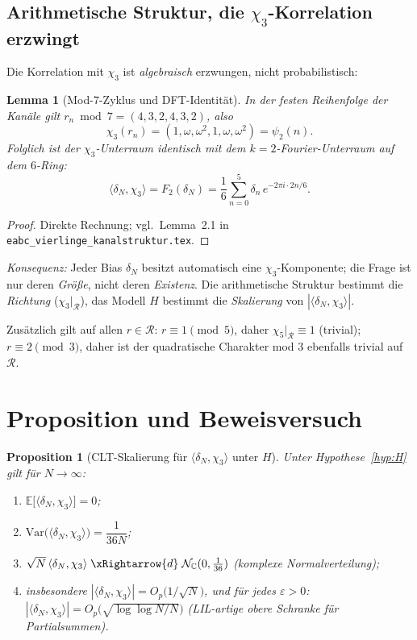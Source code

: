 \documentclass[11pt,a4paper]{article}
\newtheorem{proposition}[theorem]{Proposition}
\newtheorem{lemma}[theorem]{Lemma}
\newcommand{\R}{\mathcal{R}}
\newcommand{\E}{\mathbb{E}}
\newcommand{\Var}{\mathrm{Var}}
\begin{document}
\subsection{Arithmetische Struktur, die $\chi_3$-Korrelation erzwingt}

Die Korrelation mit $\chi_3$ ist \emph{algebraisch} erzwungen, nicht
probabilistisch:

\begin{lemma}[Mod-$7$-Zyklus und DFT-Identität]
\label{lem:cycle}
In der festen Reihenfolge der Kanäle gilt
$r_n\bmod 7 = (4,3,2,4,3,2)$, also
\[
  \chi_3(r_n) = (1,\omega,\omega^2,1,\omega,\omega^2) = \psi_2(n).
\]
Folglich ist der $\chi_3$-Unterraum \emph{identisch} mit dem
$k{=}2$-Fourier-Unterraum auf dem $6$-Ring:
\[
  \langle\delta_N,\chi_3\rangle = F_2(\delta_N)
  = \frac{1}{6}\sum_{n=0}^{5}\delta_n\,e^{-2\pi i\cdot 2n/6}.
\]
\end{lemma}

\begin{proof}
Direkte Rechnung; vgl.\ Lemma~2.1 in \texttt{eabc\_vierlinge\_kanalstruktur.tex}.
\end{proof}

\emph{Konsequenz:} Jeder Bias $\delta_N$ besitzt automatisch eine
$\chi_3$-Komponente; die Frage ist nur deren \emph{Größe}, nicht deren
\emph{Existenz}. Die arithmetische Struktur bestimmt die
\emph{Richtung} ($\chi_3|_{\R}$), das Modell $H$ bestimmt die
\emph{Skalierung} von $|\langle\delta_N,\chi_3\rangle|$.

Zusätzlich gilt auf allen $r\in\R$:
$r\equiv 1\pmod{5}$, daher $\chi_5|_{\R}\equiv 1$ (trivial);
$r\equiv 2\pmod{3}$, daher ist der quadratische Charakter mod $3$
ebenfalls trivial auf $\R$.

\section{Proposition und Beweisversuch}

\begin{proposition}[CLT-Skalierung für $\langle\delta_N,\chi_3\rangle$ unter $H$]
\label{prop:clt}
Unter Hypothese~\ref{hyp:H} gilt für $N\to\infty$:
\begin{enumerate}
  \item $\E\bigl[\langle\delta_N,\chi_3\rangle\bigr] = 0$;
  \item $\Var\bigl(\langle\delta_N,\chi_3\rangle\bigr) = \dfrac{1}{36N}$;
  \item $\sqrt{N}\,\langle\delta_N,\chi_3\rangle
        \;\xRightarrow{d}\;
        \mathcal{N}_{\mathbb{C}}(0,\tfrac{1}{36})$
        (komplexe Normalverteilung);
  \item insbesondere
        $|\langle\delta_N,\chi_3\rangle| = O_p\!\bigl(1/\sqrt{N}\bigr)$,
        und für jedes $\varepsilon>0$:
        $|\langle\delta_N,\chi_3\rangle| = O_p\!\bigl(\sqrt{\log\log N/N}\bigr)$
        (LIL-artige obere Schranke für Partialsummen).
\end{enumerate}
\end{proposition}
\end{document}
